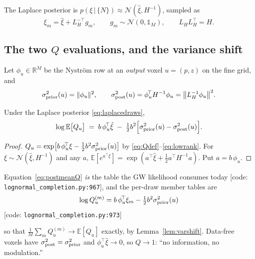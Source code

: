 The Laplace posterior is $p(\xi\,|\,\{N\})\approx\mathcal N(\hat\xi,H^{-1})$,
sampled as
\begin{equation}
  \xi_m=\hat\xi+L_H^{-\!\top}g_m,\qquad g_m\sim\mathcal N(0,\mathbb 1_M),
  \qquad L_HL_H^{\!\top}=H .
  \label{eq:laplacedraws}
\end{equation}

\subsection{The two $Q$ evaluations, and the variance shift}

Let $\phi_u\in\mathbb R^M$ be the Nystr\"om row at an \emph{output} voxel
$u=(p,z)$ on the fine grid, and
\begin{equation}
  \sigma^2_{\rm prior}(u)=\|\phi_u\|^2,
  \qquad
  \sigma^2_{\rm post}(u)=\phi_u^{\!\top}H^{-1}\phi_u=\big\|L_H^{-1}\phi_u\big\|^2 .
\end{equation}

\begin{lemma}
\label{lem:varshift}
Under the Laplace posterior \eqref{eq:laplacedraws},
\begin{equation}
  \log\mathbb E\big[Q_u\big]
  \;=\;b\,\phi_u^{\!\top}\hat\xi
  \;-\;\tfrac12 b^2\Big[\sigma^2_{\rm prior}(u)-\sigma^2_{\rm post}(u)\Big].
  \label{eq:postmeanQ}
\end{equation}
\end{lemma}
\begin{proof}
$Q_u=\exp\!\big[b\,\phi_u^{\!\top}\xi-\tfrac12b^2\sigma^2_{\rm prior}(u)\big]$
by \eqref{eq:Qdef}--\eqref{eq:lowrank}.  For $\xi\sim\mathcal N(\hat\xi,H^{-1})$
and any $a$, $\mathbb E[e^{a^{\!\top}\xi}]=\exp(a^{\!\top}\hat\xi+\tfrac12
a^{\!\top}H^{-1}a)$.  Put $a=b\,\phi_u$.
\end{proof}

\noindent Equation~\eqref{eq:postmeanQ} \emph{is} the table the GW likelihood
consumes today [code: \texttt{lognormal\_completion.py:967}], and the per-draw
member tables are
\begin{equation}
  \log Q^{(m)}_u=b\,\phi_u^{\!\top}\xi_m-\tfrac12 b^2\sigma^2_{\rm prior}(u)
  \label{eq:memberQ}
\end{equation}
\hfill[code: \texttt{lognormal\_completion.py:973}]

\noindent so that $\tfrac1M\sum_m Q^{(m)}_u\to\mathbb E[Q_u]$ exactly, by
Lemma~\ref{lem:varshift}.  Data-free voxels have
$\sigma^2_{\rm post}=\sigma^2_{\rm prior}$ and $\phi_u^{\!\top}\hat\xi\to0$, so
$Q\to1$: ``no information, no modulation.''

